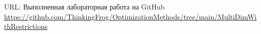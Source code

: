 \documentclass[../body.tex]{subfiles}
\begin{document}
URL: Выполненная лабораторная работа на GitHub \\ \url{https://github.com/ThinkingFrog/OptimizationMethods/tree/main/MultiDimWithRestrictions}
\end{document}
